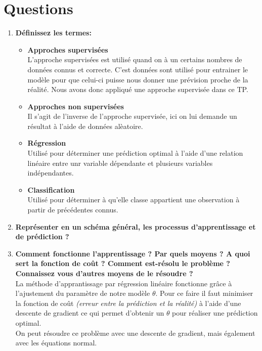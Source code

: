 \section{Questions}

\begin{enumerate}
    \item \textbf{Déﬁnissez les termes:}
    \begin{itemize}
        \item \textbf{Approches supervisées} \\
        L'approche supervisées est utilisé quand on à un certains nombres de données connus et correcte. C'est données sont utilisé pour entrainer le modèle pour que celui-ci puisse nous 
        donner une prévision proche de la réalité. Nous avons donc appliqué une approche supervisée dans ce TP.

        \item \textbf{Approches non supervisées} \\
        Il s'agit de l'inverse de l'approche supervisée, ici on lui demande un résultat à l'aide de données alèatoire.

        \item \textbf{Régression} \\
        Utilisé pour déterminer une prédiction optimal à l'aide d'une relation linéaire entre unr variable dépendante et plusieurs variables indépendantes.

        \item \textbf{Classification} \\
        Utilisé pour déterminer à qu'elle classe appartient une observation à partir de précédentes connus.

    \end{itemize}
    \item \textbf{Représenter en un schéma général, les processus d'apprentissage et de prédiction ?} \\
    \item \textbf{Comment fonctionne l'apprentissage ? Par quels moyens ? A quoi sert la fonction de coût ? Comment est-résolu le problème ? Connaissez vous d'autres moyens de le résoudre ?} \\
    La méthode d'apprantissage par régression linéaire fonctionne grâce à l'ajustement du paramètre de notre modèle $\theta$. Pour ce faire il faut minimiser la fonction de coût \textit{(erreur entre la prédiction et la réalité)} à l'aide
    d'une descente de gradient ce qui permet d'obtenir un $\theta$ pour réaliser une prédiction optimal. \\
    On peut résoudre ce problème avec une descente de gradient, mais également avec les équations normal.


\end{enumerate}
